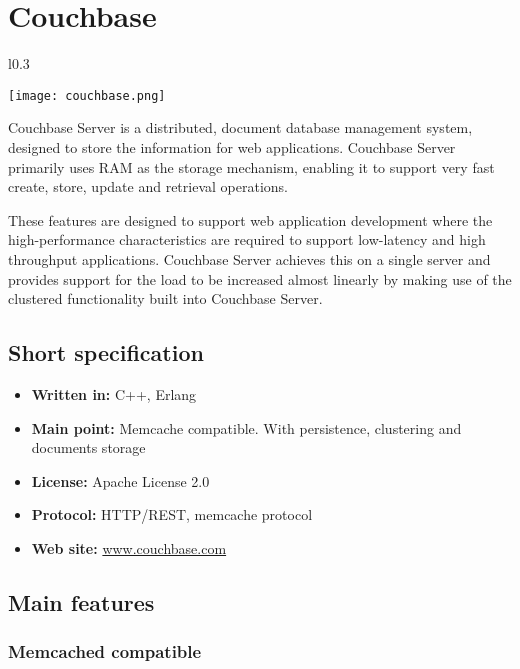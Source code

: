 \chapter{Couchbase}

\begin{wrapfigure}{l}{0.3\textwidth}
  \vspace{-100pt}
  \begin{center}
    \texttt{[image: couchbase.png]}
  \end{center}
  \vspace{-30pt}
\end{wrapfigure}
Couchbase Server is a distributed, document database management system, designed to store the information for web applications. Couchbase Server primarily uses RAM as the storage mechanism, enabling it to support very fast create, store, update and retrieval operations.

These features are designed to support web application development where the high-performance characteristics are required to support low-latency and high throughput applications. Couchbase Server achieves this on a single server and provides support for the load to be increased almost linearly by making use of the clustered functionality built into Couchbase Server.

\section{Short specification}

\begin{itemize}
  \item \textbf{Written in:} C++, Erlang
  \item \textbf{Main point:} Memcache compatible. With persistence, clustering and documents storage
  \item \textbf{License:} Apache License 2.0
  \item \textbf{Protocol:} HTTP/REST, memcache protocol
  \item \textbf{Web site:} \href{http://www.couchbase.com/}{www.couchbase.com}
\end{itemize}

\section{Main features}

\subsection{Memcached compatible}


